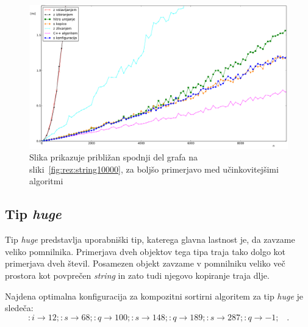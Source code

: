 \documentclass[a4paper,oneside,12pt]{article}
\newcommand{\lra}{\ensuremath{\longrightarrow}}
\newcommand{\edot}{\;\;\;.}
\begin{document}
\begin{figure}[h!]
    \includegraphics[width=\textwidth]{slike/string10000zoom.pdf}
    \vspace{-0.7cm}
    \caption[Rezultati za tip \emph{string}, 10.000 el. -- približano]
    {Slika prikazuje približan spodnji del grafa na sliki~\ref{fig:rez:string10000},
    za boljšo primerjavo med učinkovitejšimi algoritmi}
    \label{fig:rez:string10000zoom}
\end{figure}
\pagebreak

\subsection{Tip \emph{huge}}
\label{chapter:rez:huge}
Tip \emph{huge} predstavlja uporabniški tip, katerega glavna lastnost je, da zavzame veliko pomnilnika.
Primerjava dveh objektov tega tipa traja tako dolgo kot primerjava dveh števil. Posamezen objekt
zavzame v pomnilniku veliko več prostora kot povprečen \emph{string} in zato tudi njegovo kopiranje 
traja dlje.

Najdena optimalna konfiguracija za kompozitni sortirni algoritem za tip \emph{huge} je sledeča:
\[ :i \lra 12;:s \lra 68;:q \lra 100;:s \lra 148;:q \lra 189;:s \lra 287;:q \lra -1; \edot \]
\end{document}
